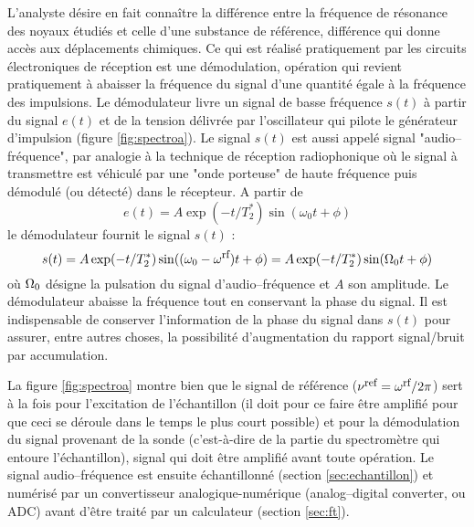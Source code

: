 L'analyste désire en fait connaître la différence entre la fréquence de résonance des
noyaux étudiés et celle d'une substance de référence, différence qui donne accès aux
déplacements chimiques.
Ce qui est réalisé pratiquement par les circuits
électroniques de réception est une démodulation, opération qui
revient pratiquement à abaisser la fréquence du signal
d'une quantité égale à la fréquence des impulsions.
Le démodulateur livre un signal de basse fréquence $s(t)$ à partir du
signal $e(t)$ et de la tension délivrée par l'oscillateur qui pilote le générateur d'impulsion
(figure \ref{fig:spectroa}).
Le signal $s(t)$ est aussi appelé signal "audio--fréquence", par analogie à la
technique de réception radiophonique où le signal à transmettre est véhiculé par une
"onde porteuse" de haute fréquence puis démodulé (ou détecté) dans le récepteur.
A partir de
\begin{equation}
e(t) = A \exp(-t/T_2^*) \sin(\omega_0 t + \phi)
\end{equation}
le démodulateur fournit le signal $s(t)$ :
\begin{equation}
s(t) = A \exp(-t/T_2^*) \sin((\omega_0-\omega^{\mbox{\footnotesize{rf}}}) t + \phi)
= A \exp(-t/T_2^*) \sin(\Omega_0 t + \phi)
\end{equation}
où $\Omega_0$ désigne la pulsation du signal d'audio--fréquence et $A$ son amplitude.
Le démodulateur abaisse la fréquence tout en conservant la phase du signal.
Il est indispensable de conserver l'information de la phase du signal dans $s(t)$ pour assurer,
entre autres choses, la possibilité d'augmentation du rapport signal/bruit par
accumulation.

La figure \ref{fig:spectroa} montre bien que le signal de référence ($\nu^{\mbox{\footnotesize{ref}}} = \omega^{\mbox{\footnotesize{rf}}}/2\pi$)
sert à la fois pour l'excitation de l'échantillon (il doit pour ce faire être amplifié
pour que ceci se déroule dans le temps le plus court possible) et pour la démodulation
du signal provenant de la sonde (c'est-à-dire de la partie du spectromètre qui 
entoure l'échantillon), signal qui doit être amplifié avant toute opération.
Le signal audio--fréquence est ensuite échantillonné (section \ref{sec:echantillon})
et numérisé par un convertisseur analogique-numérique (analog--digital converter, ou ADC) 
avant d'être traité par un calculateur (section \ref{sec:ft}).

